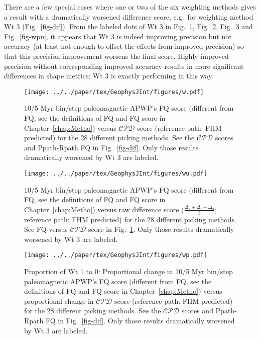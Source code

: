 There are a few special cases where one or two of the six weighting methods
gives a result with a dramatically worsened difference score, e.g.\ for
weighting method Wt 3 (Fig.~\ref{fig-dif}). From the labeled dots of Wt 3 in
Fig.~\ref{fig-w}, Fig.~\ref{fig-wu}, Fig.~\ref{fig-wp} and Fig.~\ref{fig-wpu},
it appears that Wt 3 is indeed improving precision but not accuracy (at least
not enough to offset the effects from improved precision) so that this precision
improvement worsens the final score. Highly improved precision without
corresponding improved accuracy results in more significant differences in shape
metrics: Wt 3 is exactly performing in this way.

\begin{figure}
  \vspace{-4mm}
  \captionsetup{skip=-6pt}
  \centering
  \texttt{[image: ../../paper/tex/GeophysJInt/figures/w.pdf]}
  \caption[Paleomagnetic APWP's FQ score vs significant difference score (i.e.
    $\mathcal{CPD}$)]{10/5 Myr bin/step paleomagnetic APWP's FQ score (different
    from FQ, see the definitions of FQ and FQ score in Chapter~\ref{chap:Metho})
    versus $\mathcal{CPD}$ score (reference path: FHM predicted) for the 28
    different picking methods. See the $\mathcal{CPD}$ scores and Ppath-Rpath FQ
    in Fig.~\ref{fig-dif}. Only those results dramatically worsened by Wt 3 are
    labeled.}\label{fig-w}
\end{figure}

\begin{figure}
  \vspace{-4mm}
  \captionsetup{skip=-6pt}
  \centering
  \texttt{[image: ../../paper/tex/GeophysJInt/figures/wu.pdf]}
  \caption[Paleomagnetic APWP's FQ score vs raw difference score (i.e., no
    statistical testing)]{10/5 Myr bin/step paleomagnetic APWP's FQ score
    (different from FQ, see the definitions of FQ and FQ score in
    Chapter~\ref{chap:Metho}) versus raw difference score
    ($\frac{\Delta_s+\Delta_l+\Delta_a}{3}$; reference path: FHM predicted) for
    the 28 different picking methods. See FQ versus $\mathcal{CPD}$ score in
    Fig.~\ref{fig-w}. Only those results dramatically worsened by Wt 3 are
    labeled.}\label{fig-wu}
\end{figure}

\begin{figure}
  \vspace{-4mm}
  \captionsetup{skip=-10pt}
  \centering
  \texttt{[image: ../../paper/tex/GeophysJInt/figures/wp.pdf]}
  \caption[Proportional changes of Wt 1 to 0: Paleomagnetic APWP's
    FQ score vs $\mathcal{CPD}$]{Proportion of Wt 1 to 0:
    Proportional change in 10/5 Myr bin/step paleomagnetic APWP's FQ score
    (different from FQ, see the definitions of FQ and FQ score in
    Chapter~\ref{chap:Metho}) versus proportional change in $\mathcal{CPD}$
    score (reference path: FHM predicted) for the 28 different picking methods.
    See the $\mathcal{CPD}$ scores and Ppath-Rpath FQ in Fig.~\ref{fig-dif}.
    Only those results dramatically worsened by Wt 3 are labeled.}\label{fig-wp}
\end{figure}

